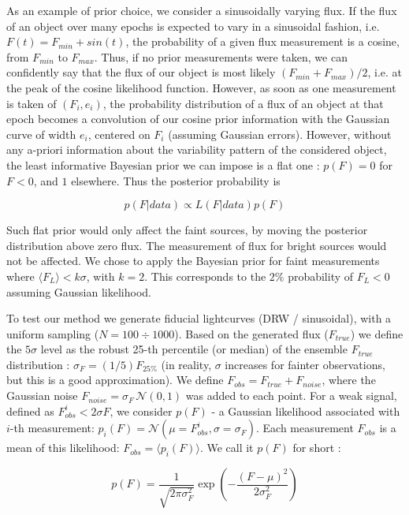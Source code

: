 \documentclass[fleqn,usenatbib]{mnras}  %
\begin{document}
As an example of prior choice, we consider a sinusoidally varying flux.  If the flux of an object over many epochs is expected to vary in a sinusoidal fashion, i.e. $F(t) = F_{min}+ sin(t)$, the probability of a given  flux measurement is a cosine, from $F_{min}$ to $F_{max}$. Thus, if no prior measurements were taken, we can confidently say that the flux of our object is most likely  $(F_{min} + F_{max}) /  2$, i.e. at the peak of the cosine likelihood function. However, as soon as one measurement is taken of $(F_{i},e_{i})$, the probability distribution of a flux of an object at that epoch becomes a convolution of our cosine prior information with the Gaussian curve of width $e_{i}$, centered on $F_{i}$ (assuming Gaussian errors). However, without any a-priori information about the variability pattern of the considered object, the least informative Bayesian prior we can impose is a flat one : $p(F)=0 $ for $F<0$, and $1$ elsewhere. Thus the posterior probability is 

\begin{equation}
p(F|data) \propto L(F|data) p(F)
\end{equation}

Such flat prior would only affect the faint sources, by moving the posterior distribution above zero flux.  The measurement of flux for bright sources would not be affected. We chose to apply the Bayesian prior  for faint measurements where  $ \langle F_{L} \rangle  < k \sigma$, with $k=2$. This corresponds to the $2\%$ probability of $F_{L} < 0$  assuming Gaussian likelihood. 

To test our method we generate fiducial lightcurves (DRW / sinusoidal), with a uniform sampling ($N=100\div1000$). Based on the generated flux ($F_{true}$) we define the $5\sigma$ level as the robust 25-th percentile (or median) of the ensemble $F_{true}$ distribution :  $\sigma_{F} = (1/5)  F_{25 \%}$ (in reality, $\sigma$ increases for fainter observations, but this is a good approximation). 
\newline
We define $F_{obs} = F_{true} + F_{noise}$, where the Gaussian noise $F_{noise} = \sigma_{F}  \, \mathcal{N}(0,1)$ was added to each point. 
For a weak signal, defined as $F_{obs}^{i} < 2 \sigma{F}$, we consider $p(F)$  - a  Gaussian  likelihood associated with $i$-th measurement: $p_{i}(F) = \mathcal{N}(\mu=F_{obs}^{i}, \sigma=\sigma_{F})$. Each measurement $F_{obs}$ is a mean of this likelihood: $F_{obs} = \langle p_{i}(F) \rangle$. We call it $p(F)$  for short : 

\begin{equation}
p(F) = \frac{1}{\sqrt{2  \pi \sigma_{F}^{2}}} \exp{ \left(-\frac{(F-\mu)^{2}}{2\sigma_{F}^{2}}\right)}
\end{equation}
\end{document}
